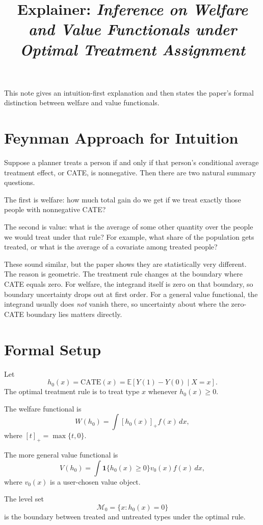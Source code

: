 \documentclass[11pt]{article}
\begin{document}
\title{Explainer: \emph{Inference on Welfare and Value Functionals under Optimal Treatment Assignment}}
\author{}
\date{}
\maketitle

This note gives an intuition-first explanation and then states the paper's formal distinction between welfare and value functionals.

\section{Feynman Approach for Intuition}

Suppose a planner treats a person if and only if that person's conditional average treatment effect, or CATE, is nonnegative. Then there are two natural summary questions.

The first is welfare: how much total gain do we get if we treat exactly those people with nonnegative CATE?

The second is value: what is the average of some other quantity over the people we would treat under that rule? For example, what share of the population gets treated, or what is the average of a covariate among treated people?

These sound similar, but the paper shows they are statistically very different. The reason is geometric. The treatment rule changes at the boundary where CATE equals zero. For welfare, the integrand itself is zero on that boundary, so boundary uncertainty drops out at first order. For a general value functional, the integrand usually does \emph{not} vanish there, so uncertainty about where the zero-CATE boundary lies matters directly.

\section{Formal Setup}

Let
\[
h_0(x)=\mathrm{CATE}(x)=\mathbb E[Y(1)-Y(0)\mid X=x].
\]
The optimal treatment rule is to treat type $x$ whenever $h_0(x)\ge 0$.

The welfare functional is
\[
W(h_0)=\int [h_0(x)]_+ f(x)\,dx,
\]
where $[t]_+=\max\{t,0\}$.

The more general value functional is
\[
V(h_0)=\int \mathbf 1\{h_0(x)\ge 0\}v_0(x)f(x)\,dx,
\]
where $v_0(x)$ is a user-chosen value object.

The level set
\[
\mathcal M_0=\{x:h_0(x)=0\}
\]
is the boundary between treated and untreated types under the optimal rule.
\end{document}

